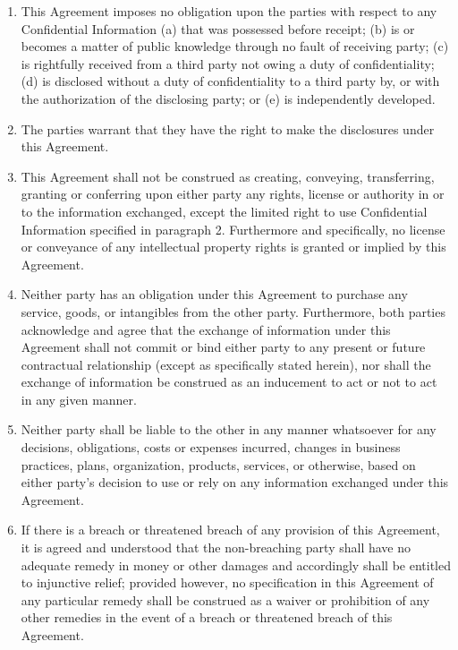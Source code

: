 \documentclass[a4paper, 11pt, twoside]{article}
\begin{document}
\begin{enumerate}
\item This Agreement imposes no obligation upon the parties with respect to any Confidential Information (a) that was possessed before receipt; (b) is or becomes a matter of public knowledge through no fault of receiving party; (c) is rightfully received from a third party not owing a duty of confidentiality; (d) is disclosed without a duty of confidentiality to a third party by, or with the authorization of the disclosing party; or (e) is independently developed.

\item The parties warrant that they have the right to make the disclosures under this Agreement.

\item This Agreement shall not be construed as creating, conveying, transferring, granting or conferring upon either party any rights, license or authority in or to the information exchanged, except the limited right to use Confidential Information specified in paragraph 2. Furthermore and specifically, no license or conveyance of any intellectual property rights is granted or implied by this Agreement.

\item Neither party has an obligation under this Agreement to purchase any service, goods, or intangibles from the other party. Furthermore, both parties acknowledge and agree that the exchange of information under this Agreement shall not commit or bind either party to any present or future contractual relationship (except as specifically stated herein), nor shall the exchange of information be construed as an inducement to act or not to act in any given manner.

\item Neither party shall be liable to the other in any manner whatsoever for any decisions, obligations, costs or expenses incurred, changes in business practices, plans, organization, products, services, or otherwise, based on either party's decision to use or rely on any information exchanged under this Agreement.

\item If there is a breach or threatened breach of any provision of this Agreement, it is agreed and understood that the non-breaching party shall have no adequate remedy in money or other damages and accordingly shall be entitled to injunctive relief; provided however, no specification in this Agreement of any particular remedy shall be construed as a waiver or prohibition of any other remedies in the event of a breach or threatened breach of this Agreement.


\end{enumerate}
\end{document}
